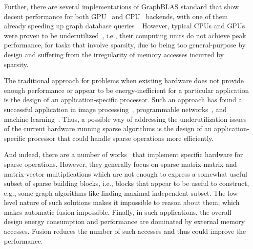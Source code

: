 
Further, there are several implementations of GraphBLAS standard that show decent performance for both GPU~\cite{yang2020graphblast} and CPU~\cite{SuiteSparse} backends, with one of them already speeding up graph database queries~\cite{redis}. However, typical CPUs and GPUs were proven to be underutilized~\cite{Florida,leskovec2016snap,Song_2016,zhang2020sparch}, i.e., their computing units do not achieve peak performance, for tasks that involve sparsity, due to being too general-purpose by design and suffering from the irregularity of memory accesses incurred by sparsity. 

The traditional approach for problems when existing hardware does not provide enough performance or appear to be energy-inefficient for a particular application is the design of an application-specific processor. Such an approach has found a successful application in image processing~\cite{halide,redgrave2018pixel}, programmable networks~\cite{barefoot}, and machine learning~\cite{GoogleTPU,TensorFlowXLA}. Thus, a possible way of addressing the underutilization issues of the current hardware running sparse algorithms is the design of an application-specific processor that could handle sparse operations more efficiently. 


And indeed, there are a number of works~\cite{Song_2016,SMASH,zhang2020sparch,Systolic} that implement specific hardware for sparse operations. 
However, they generally focus on sparse matrix-matrix and matrix-vector multiplications which are not enough to express a somewhat useful subset of sparse building blocks, i.e., blocks that appear to be useful to construct, e.g., some graph algorithms like finding maximal independent subset.
The low-level nature of such solutions makes it impossible to reason about them, which makes automatic fusion impossible. Finally,
in such applications, the overall design energy consumption and performance are dominated by external memory accesses. Fusion reduces the number of such accesses and thus could improve the performance.



